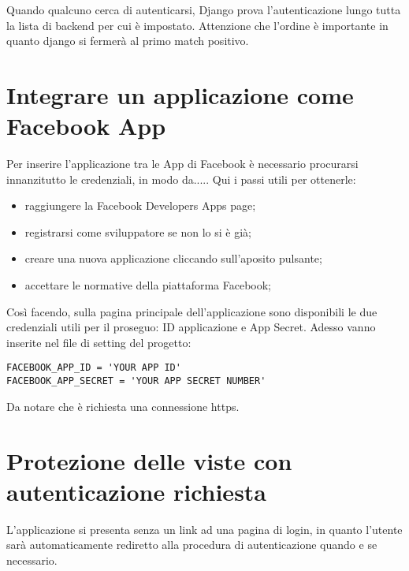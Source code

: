 
Quando qualcuno cerca di autenticarsi, Django prova l'autenticazione lungo tutta la lista di backend per cui è impostato. 
Attenzione che l'ordine è importante in quanto django si fermerà al primo match positivo.


\section{Integrare un applicazione come Facebook App}
Per inserire l'applicazione tra le App di Facebook è necessario procurarsi innanzitutto le credenziali, in modo da.....
Qui i passi utili per ottenerle:
\begin{itemize}
	\item raggiungere la Facebook Developers Apps page;
	\item registrarsi come sviluppatore se non lo si è già;
	\item creare una nuova applicazione cliccando sull'aposito pulsante;
	\item accettare le normative della piattaforma Facebook;
\end{itemize}
Così facendo, sulla pagina principale dell'applicazione sono disponibili le due credenziali utili per il proseguo: ID applicazione e App Secret.
Adesso vanno inserite nel file di setting del progetto:

\begin{lstlisting}[frame=single]
FACEBOOK_APP_ID = 'YOUR APP ID'
FACEBOOK_APP_SECRET = 'YOUR APP SECRET NUMBER'
\end{lstlisting}
Da notare che è richiesta una connessione https.

\section{Protezione delle viste con autenticazione richiesta}
L'applicazione si presenta senza un link ad una pagina di login, in quanto l'utente sarà automaticamente rediretto alla procedura di autenticazione quando e se necessario. 

